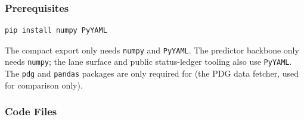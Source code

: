 \subsubsection{Prerequisites}\label{121-prerequisites}

\begin{verbatim}
pip install numpy PyYAML
\end{verbatim}

The compact export only needs \texttt{numpy} and \texttt{PyYAML}. The
 predictor backbone only needs \texttt{numpy}; the
lane surface and public status-ledger tooling also use \texttt{PyYAML}. The
\texttt{pdg} and \texttt{pandas} packages are only required for
 (the PDG data fetcher, used for comparison
only).

\subsubsection{Code Files}\label{122-code-files}

